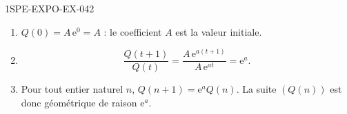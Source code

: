 \begin{corrige}{1SPE-EXPO-EX-042}
\begin{enumerate}
\item $Q(0)=A\,\mathrm{e}^{0}=A$ : le coefficient $A$ est la valeur initiale.
\item
\[\frac{Q(t+1)}{Q(t)}=\frac{A\,\mathrm{e}^{a(t+1)}}{A\,\mathrm{e}^{at}}=\mathrm{e}^{a}.\]
\item Pour tout entier naturel $n$, $Q(n+1)=\mathrm{e}^{a}Q(n)$. La suite $(Q(n))$ est donc géométrique de raison $\mathrm{e}^{a}$.
\end{enumerate}
\end{corrige}
